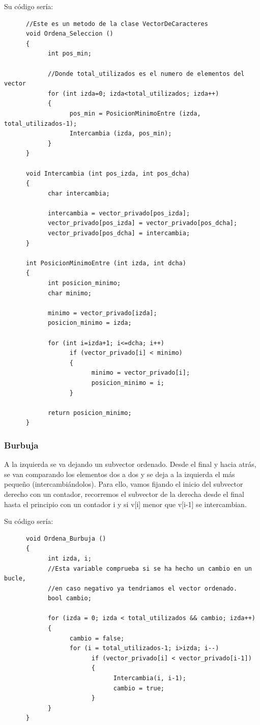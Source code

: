 \documentclass[10pt,a4paper,spanish]{report}
\begin{document}
                        \noindent
                        Su código sería:
      \begin{verbatim}
      //Este es un metodo de la clase VectorDeCaracteres
      void Ordena_Seleccion ()
      {
            int pos_min;

            //Donde total_utilizados es el numero de elementos del vector
            for (int izda=0; izda<total_utilizados; izda++)
            {
                  pos_min = PosicionMinimoEntre (izda, total_utilizados-1);
                  Intercambia (izda, pos_min);
            }
      }

      void Intercambia (int pos_izda, int pos_dcha)
      {
            char intercambia;

            intercambia = vector_privado[pos_izda];
            vector_privado[pos_izda] = vector_privado[pos_dcha];
            vector_privado[pos_dcha] = intercambia;
      }

      int PosicionMinimoEntre (int izda, int dcha)
      {
            int posicion_minimo;
            char minimo;

            minimo = vector_privado[izda];
            posicion_minimo = izda;

            for (int i=izda+1; i<=dcha; i++)
                  if (vector_privado[i] < minimo)
                  {
                        minimo = vector_privado[i];
                        posicion_minimo = i;
                  }

            return posicion_minimo;
      }
      \end{verbatim}
                  \subsubsection{\textcolor[rgb]{0.5,0.8,0.1}Burbuja}
                  \noindent
                        A la izquierda se va dejando un subvector ordenado. Desde el final y hacia atrás, se van comparando los elementos dos a dos y se deja a la izquierda el más pequeño (intercambiándolos). Para ello, vamos fijando el inicio del subvector derecho con un contador, recorremos el subvector de la derecha desde el final hasta el principio con un contador i y si v[i] menor que v[i-1] se intercambian.

                        \noindent
                        Su código sería:
      \begin{verbatim}
      void Ordena_Burbuja ()
      {
            int izda, i;
            //Esta variable comprueba si se ha hecho un cambio en un bucle,
            //en caso negativo ya tendriamos el vector ordenado.
            bool cambio;

            for (izda = 0; izda < total_utilizados && cambio; izda++)
            {
                  cambio = false;
                  for (i = total_utilizados-1; i>izda; i--)
                        if (vector_privado[i] < vector_privado[i-1])
                        {
                              Intercambia(i, i-1);
                              cambio = true;
                        }
            }
      }
      \end{verbatim}
\end{document}
